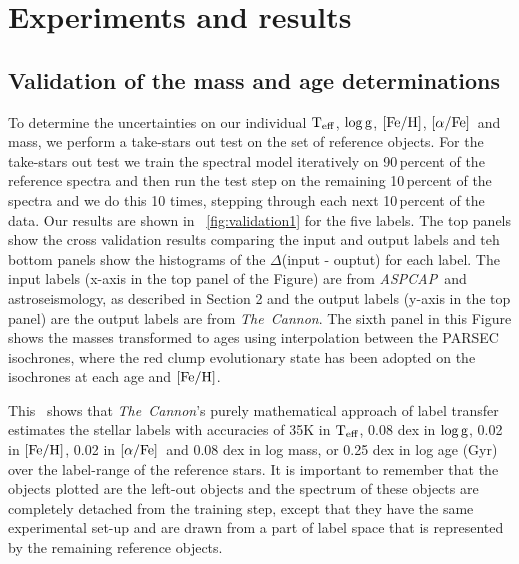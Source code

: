 \documentclass[12pt, preprint]{aastex}
\newcommand{\project}[1]{\textsl{#1}}
\newcommand{\tc}{\project{The~Cannon}}
\newcommand{\aspcap}{\project{ASPCAP}}
\newcommand{\teff}{\mbox{$\rm T_{eff}$}}
\newcommand{\feh}{\mbox{$\rm [Fe/H]$}}
\newcommand{\alphafe}{\mbox{$\rm [\alpha/Fe]$}}
\newcommand{\logg}{\mbox{$\rm \log g$}}
\begin{document}
\section{Experiments and results}

\subsection{Validation of the mass and age determinations}

To determine the uncertainties on our individual \teff, \logg, \feh, \alphafe\ and mass, we perform a take-stars out test on the set of reference objects.
For the take-stars out test we train the spectral model iteratively on 90\,percent of the reference spectra and then run the test step on the remaining 10\,percent of the spectra and we do this 10 times, stepping through each next 10\,percent of the data. Our results are shown in \figurename~\ref{fig:validation1} for the five labels. The top panels show the cross validation results comparing the input and output labels and teh bottom panels show the histograms of the $\Delta$(input - ouptut) for each label. The input labels (x-axis in the top panel of the Figure) are from \aspcap\ and astroseismology, as described in Section 2 and the output labels (y-axis in the top panel) are the output labels are from \tc.  The sixth panel in this Figure shows the masses transformed to ages using interpolation between the PARSEC isochrones, where the red clump evolutionary state has been adopted on the isochrones at each age and \feh. 

This \figurename\ shows that \tc 's purely mathematical approach of label transfer estimates the stellar labels with accuracies of 35K in \teff, 0.08 dex in \logg, 0.02 in \feh, 0.02 in \alphafe\ and  0.08 dex in log mass, or 0.25 dex in log age (Gyr) over the label-range of the reference stars. It is important to remember that the objects plotted are the left-out objects and the spectrum of these objects are completely detached from the training step,  except that they have the same experimental set-up and are drawn from a part of label space that is represented by the remaining reference objects.
\end{document}
